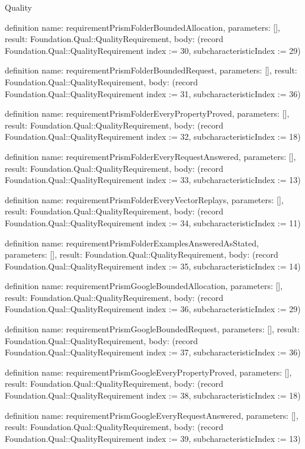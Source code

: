 \begin{lexlean}{Quality}
\begin{semanticmodule}
definition{
  name: requirementPrismFolderBoundedAllocation,
  parameters: [],
  result: Foundation.Qual::QualityRequirement,
  body: (record Foundation.Qual::QualityRequirement {index := 30, subcharacteristicIndex := 29})
}

definition{
  name: requirementPrismFolderBoundedRequest,
  parameters: [],
  result: Foundation.Qual::QualityRequirement,
  body: (record Foundation.Qual::QualityRequirement {index := 31, subcharacteristicIndex := 36})
}

definition{
  name: requirementPrismFolderEveryPropertyProved,
  parameters: [],
  result: Foundation.Qual::QualityRequirement,
  body: (record Foundation.Qual::QualityRequirement {index := 32, subcharacteristicIndex := 18})
}

definition{
  name: requirementPrismFolderEveryRequestAnswered,
  parameters: [],
  result: Foundation.Qual::QualityRequirement,
  body: (record Foundation.Qual::QualityRequirement {index := 33, subcharacteristicIndex := 13})
}

definition{
  name: requirementPrismFolderEveryVectorReplays,
  parameters: [],
  result: Foundation.Qual::QualityRequirement,
  body: (record Foundation.Qual::QualityRequirement {index := 34, subcharacteristicIndex := 11})
}

definition{
  name: requirementPrismFolderExamplesAnsweredAsStated,
  parameters: [],
  result: Foundation.Qual::QualityRequirement,
  body: (record Foundation.Qual::QualityRequirement {index := 35, subcharacteristicIndex := 14})
}

definition{
  name: requirementPrismGoogleBoundedAllocation,
  parameters: [],
  result: Foundation.Qual::QualityRequirement,
  body: (record Foundation.Qual::QualityRequirement {index := 36, subcharacteristicIndex := 29})
}

definition{
  name: requirementPrismGoogleBoundedRequest,
  parameters: [],
  result: Foundation.Qual::QualityRequirement,
  body: (record Foundation.Qual::QualityRequirement {index := 37, subcharacteristicIndex := 36})
}

definition{
  name: requirementPrismGoogleEveryPropertyProved,
  parameters: [],
  result: Foundation.Qual::QualityRequirement,
  body: (record Foundation.Qual::QualityRequirement {index := 38, subcharacteristicIndex := 18})
}

definition{
  name: requirementPrismGoogleEveryRequestAnswered,
  parameters: [],
  result: Foundation.Qual::QualityRequirement,
  body: (record Foundation.Qual::QualityRequirement {index := 39, subcharacteristicIndex := 13})
}


\end{semanticmodule}
\end{lexlean}
